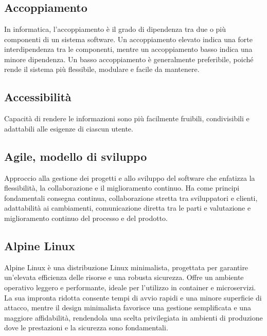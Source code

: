\appendix %



\section{}

\hypertarget{sec:accoppiamento}{}
\subsection*{Accoppiamento}
In informatica, l'accoppiamento è il grado di dipendenza tra due o più componenti di un sistema software. Un accoppiamento elevato indica una forte
interdipendenza tra le componenti, mentre un accoppiamento basso indica una minore dipendenza. Un basso accoppiamento è generalmente preferibile, poiché
rende il sistema più flessibile, modulare e facile da mantenere.

\hypertarget{sec:accessibilità}{}
\subsection*{Accessibilità}
Capacità di rendere le informazioni sono più facilmente fruibili, condivisibili e adattabili alle esigenze di ciascun utente.

\hypertarget{sec:modello_agile}{}
\subsection*{Agile, modello di sviluppo}
Approccio alla gestione dei progetti e allo sviluppo del software che enfatizza la flessibilità, la collaborazione e il miglioramento continuo. 
Ha come principi fondamentali consegna continua, collaborazione stretta tra sviluppatori e clienti, adattabilità ai cambiamenti, 
comunicazione diretta tra le parti e valutazione e miglioramento continuo del processo e del prodotto.

\hypertarget{sec:alpine_linux}{}
\subsection*{Alpine Linux}
Alpine Linux è una distribuzione Linux minimalista, progettata per garantire un'elevata efficienza delle risorse e una robusta sicurezza. 
Offre un ambiente operativo leggero e performante, ideale per l'utilizzo in container e microservizi. La sua 
impronta ridotta consente tempi di avvio rapidi e una minore superficie di attacco, mentre il design minimalista favorisce una gestione semplificata 
e una maggiore affidabilità, rendendola una scelta privilegiata in ambienti di produzione dove le prestazioni e la sicurezza sono fondamentali.


